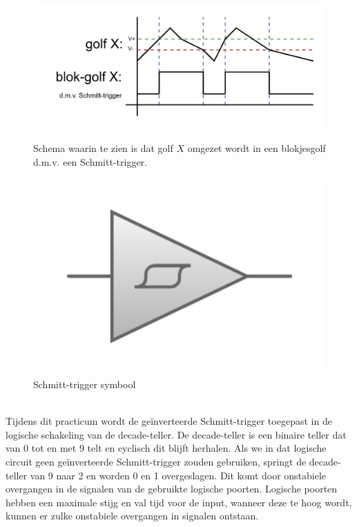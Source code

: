 \documentclass[12pt]{article}
\begin{document}
\begin{figure}[h]
    \begin{minipage}{.5\textwidth}
    \includegraphics[width=1\textwidth]{schmitt.png}
    \caption{Schema waarin te zien is dat golf $X$ omgezet wordt in een blokjesgolf d.m.v. een Schmitt-trigger.}
    \label{fig:39100}
\end{minipage}
\begin{minipage}{0.5\textwidth}
    \includegraphics[width=1\textwidth]{st.png}
    \caption{Schmitt-trigger symbool}
    \label{fig:39910}
\end{minipage}
\end{figure}\\
Tijdens dit practicum wordt de geïnverteerde Schmitt-trigger toegepast in de logische schakeling van de decade-teller. 
De decade-teller is een binaire teller dat van 0 tot en met 9 telt en cyclisch dit blijft herhalen. 
Als we in dat logische circuit geen geïnverteerde Schmitt-trigger zouden gebruiken, springt de decade-teller van 9 naar 2 en worden 0 en 1 overgeslagen.  
Dit komt door onstabiele overgangen in de signalen van de gebruikte logische poorten. 
Logische poorten hebben een maximale stijg en val tijd voor de input, wanneer deze te hoog wordt, kunnen er zulke onstabiele overgangen in signalen ontstaan.
\end{document}
